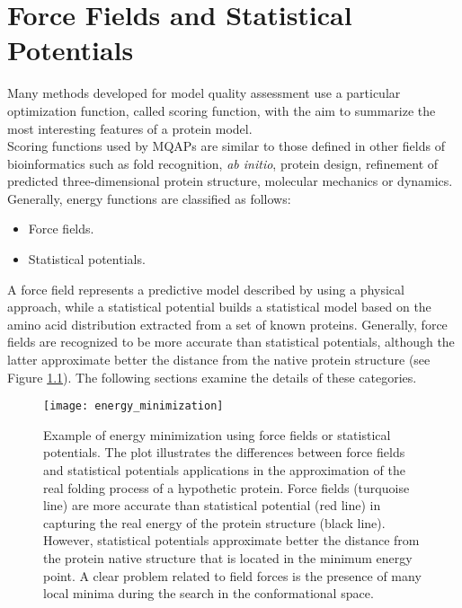 


\chapter{Force Fields and Statistical Potentials}
\label{appendix:force_fields_statistical_potentials}
Many methods developed for model quality assessment use a particular optimization function, called scoring function, with the aim to summarize the most interesting features of a protein model.\\
Scoring functions used by MQAPs are similar to those defined in other fields of bioinformatics such as fold recognition, \emph{ab initio}, protein design, refinement of predicted three-\-di\-men\-sio\-nal protein structure, molecular mechanics or dynamics. Generally, energy functions are classified as follows:
\begin{itemize}
\item Force fields.
\item Statistical potentials.
\end{itemize}
A force field represents a predictive model described by using a physical approach, while a statistical potential builds a statistical model based on the amino acid distribution extracted from a set of known proteins. Generally, force fields are recognized to be more accurate than statistical potentials, although the latter approximate better the distance from the native protein structure (see Figure \ref{fig:energy_minimization}). The following sections examine the details of these categories.
\begin{figure}[tb]
	\begin{center}
		\texttt{[image: energy\_minimization]}
		\caption[Example of energy minimization using force fields or statistical potentials]{Example of energy minimization using force fields or statistical potentials. The plot illustrates the differences between force fields and statistical potentials applications in the approximation of the real folding process of a hypothetic protein. Force fields (turquoise line) are more accurate than statistical potential (red line) in capturing the real energy of the protein structure (black line). However, statistical potentials approximate better the distance from the protein native structure that is located in the minimum energy point. A clear problem related to field forces is the presence of many local minima during the search in the conformational space.}
		\label{fig:energy_minimization}
	\end{center}
\end{figure}


